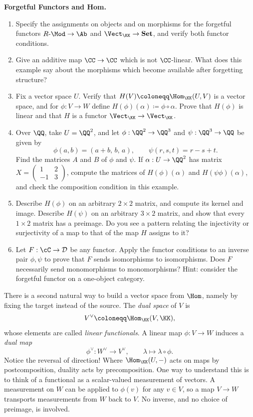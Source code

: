 \documentclass[12pt,reqno]{amsart}
\begin{document}
\begin{problems}
\item\label{c:functors} \textbf{Forgetful Functors and Hom.}
\begin{enumerate}
\item Specify the assignments on objects and on morphisms for the forgetful functors $R\text{-}\Mod\to\Ab$ and $\Vect_{\KK}\to\mathbf{Set}$, and verify both functor conditions. 

\item Give an additive map $\CC\to\CC$ which is not $\CC$-linear. What does this example say about the morphisms which become available after forgetting structure?
\item Fix a vector space $U$. Verify that $H(V)\coloneqq\Hom_{\KK}(U,V)$ is a vector space, and for $\phi:V\to W$ define $H(\phi)(\alpha)\coloneqq\phi\circ\alpha$. Prove that $H(\phi)$ is linear and that $H$ is a functor $\Vect_{\KK}\to\Vect_{\KK}$.
\item Over $\QQ$, take $U=\QQ^2$, and let $\phi:\QQ^2\to\QQ^3$ and $\psi:\QQ^3\to\QQ$ be given by
\[
\phi(a,b)=(a+b,\,b,\,a),\qquad \psi(r,s,t)=r-s+t.
\]
Find the matrices $A$ and $B$ of $\phi$ and $\psi$. If $\alpha:U\to\QQ^2$ has matrix $X=\left(\begin{smallmatrix}1&2\\-1&3\end{smallmatrix}\right)$, compute the matrices of $H(\phi)(\alpha)$ and $H(\psi\phi)(\alpha)$, and check the composition condition in this example.
\item Describe $H(\phi)$ on an arbitrary $2\times2$ matrix, and compute its kernel and image. Describe $H(\psi)$ on an arbitrary $3\times2$ matrix, and show that every $1\times2$ matrix has a preimage. Do you see a pattern relating the injectivity or surjectivity of a map to that of the map $H$ assigns to it?
\item Let $F:\cC\to\mathcal D$ be any functor. Apply the functor conditions to an inverse pair $\phi,\psi$ to prove that $F$ sends isomorphisms to isomorphisms. Does $F$ necessarily send monomorphisms to monomorphisms? Hint: consider the forgetful functor on a one-object category.

\end{enumerate}
\end{problems}

\hrulefill

There is a second natural way to build a vector space from $\Hom$, namely by fixing the target instead of the source. The \emph{dual space} of $V$ is
\[
V^{\vee}\coloneqq\Hom_{\KK}(V,\KK),
\]
whose elements are called \emph{linear functionals}. A linear map $\phi:V\to W$ induces a \emph{dual map}
\[
\phi^{\vee}:W^{\vee}\longrightarrow V^{\vee},\qquad\lambda\longmapsto\lambda\circ\phi.
\]
Notice the reversal of direction! Where $\Hom_{\KK}(U,-)$ acts on maps by postcomposition, duality acts by precomposition. One way to understand this is to think of a functional as a scalar-valued measurement of vectors. A measurement on $W$ can be applied to $\phi(v)$ for any $v\in V$, so a map $V\to W$ transports measurements from $W$ back to $V$. No inverse, and no choice of preimage, is involved.
\end{document}
